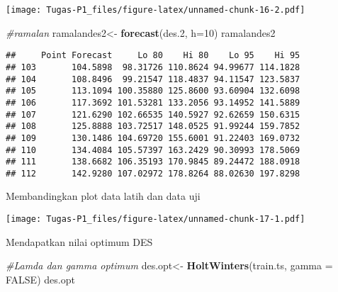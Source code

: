 \documentclass[
]{article}
\newenvironment{Shaded}{\begin{snugshade}}{\end{snugshade}}
\newcommand{\AttributeTok}[1]{\textcolor[rgb]{0.13,0.29,0.53}{#1}}
\newcommand{\CommentTok}[1]{\textcolor[rgb]{0.56,0.35,0.01}{\textit{#1}}}
\newcommand{\ConstantTok}[1]{\textcolor[rgb]{0.56,0.35,0.01}{#1}}
\newcommand{\DecValTok}[1]{\textcolor[rgb]{0.00,0.00,0.81}{#1}}
\newcommand{\FloatTok}[1]{\textcolor[rgb]{0.00,0.00,0.81}{#1}}
\newcommand{\FunctionTok}[1]{\textcolor[rgb]{0.13,0.29,0.53}{\textbf{#1}}}
\newcommand{\NormalTok}[1]{#1}
\newcommand{\OtherTok}[1]{\textcolor[rgb]{0.56,0.35,0.01}{#1}}
\newcommand{\SpecialCharTok}[1]{\textcolor[rgb]{0.81,0.36,0.00}{\textbf{#1}}}
\newcommand{\StringTok}[1]{\textcolor[rgb]{0.31,0.60,0.02}{#1}}
\begin{document}
\texttt{[image: Tugas-P1\_files/figure-latex/unnamed-chunk-16-2.pdf]}

\begin{Shaded}
\begin{Highlighting}[]
\CommentTok{\#ramalan}
\NormalTok{ramalandes2}\OtherTok{\textless{}{-}} \FunctionTok{forecast}\NormalTok{(des}\FloatTok{.2}\NormalTok{, }\AttributeTok{h=}\DecValTok{10}\NormalTok{)}
\NormalTok{ramalandes2}
\end{Highlighting}
\end{Shaded}

\begin{verbatim}
##     Point Forecast     Lo 80    Hi 80    Lo 95    Hi 95
## 103       104.5898  98.31726 110.8624 94.99677 114.1828
## 104       108.8496  99.21547 118.4837 94.11547 123.5837
## 105       113.1094 100.35880 125.8600 93.60904 132.6098
## 106       117.3692 101.53281 133.2056 93.14952 141.5889
## 107       121.6290 102.66535 140.5927 92.62659 150.6315
## 108       125.8888 103.72517 148.0525 91.99244 159.7852
## 109       130.1486 104.69720 155.6001 91.22403 169.0732
## 110       134.4084 105.57397 163.2429 90.30993 178.5069
## 111       138.6682 106.35193 170.9845 89.24472 188.0918
## 112       142.9280 107.02972 178.8264 88.02630 197.8298
\end{verbatim}

Membandingkan plot data latih dan data uji

\begin{Shaded}
\end{Shaded}

\texttt{[image: Tugas-P1\_files/figure-latex/unnamed-chunk-17-1.pdf]}

Mendapatkan nilai optimum DES

\begin{Shaded}
\begin{Highlighting}[]
\CommentTok{\#Lamda dan gamma optimum}
\NormalTok{des.opt}\OtherTok{\textless{}{-}} \FunctionTok{HoltWinters}\NormalTok{(train.ts, }\AttributeTok{gamma =} \ConstantTok{FALSE}\NormalTok{)}
\NormalTok{des.opt}
\end{Highlighting}
\end{Shaded}
\end{document}
